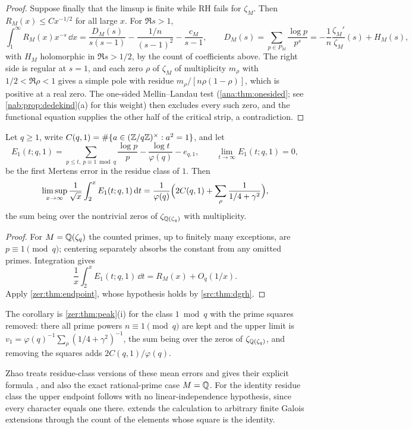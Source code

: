 \begin{proof}
Suppose finally that the limsup is finite while RH fails for $\zeta_M$. Then
$R_M(x)\le Cx^{-1/2}$ for all large $x$. For $\Re s>1$,
\[
 \int_1^\infty R_M(x)x^{-s}\,\dd x=\frac{D_M(s)}{s(s-1)}-\frac{1/n}{(s-1)^2}
 -\frac{c_M}{s-1},\qquad
 D_M(s)=\sum_{p\in P_M}\frac{\log p}{p^s}=-\frac1n\frac{\zeta_M'}{\zeta_M}(s)+H_M(s),
\]
with $H_M$ holomorphic in $\Re s>1/2$, by the count of coefficients above. The right side
is regular at $s=1$, and each zero $\rho$ of $\zeta_M$ of multiplicity $m_\rho$ with
$1/2<\Re\rho<1$ gives a simple pole with residue $m_\rho/[n\rho(1-\rho)]$, which is
positive at a real zero. The one-sided Mellin--Landau test (\cref{ana:thm:onesided};
see \cref{nab:prop:dedekind}(a) for this weight) then excludes every such zero, and the functional
equation supplies the other half of the critical strip, a contradiction.
\end{proof}

\begin{corollary}\label{zer:cor:cyclotomic}
Let $q\ge1$, write $C(q,1)=\#\{a\in(\mathbb{Z}/q\mathbb{Z})^\times:a^2=1\}$, and let
\[
 E_1(t;q,1)=\sum_{p\le t,\ p\equiv1\bmod q}\frac{\log p}p-\frac{\log t}{\varphi(q)}-e_{q,1},
 \qquad\lim_{t\to\infty}E_1(t;q,1)=0,
\]
be the first Mertens error in the residue class of $1$. Then
\[
 \limsup_{x\to\infty}\frac1{\sqrt x}\int_2^xE_1(t;q,1)\,\mathrm{d} t
 =\frac1{\varphi(q)}\Bigl(2C(q,1)+\sum_\rho\frac1{1/4+\gamma^2}\Bigr),
\]
the sum being over the nontrivial zeros of $\zeta_{\mathbb{Q}(\zeta_q)}$ with multiplicity.
\end{corollary}
\begin{proof}
For $M=\mathbb{Q}(\zeta_q)$ the counted primes, up to finitely many exceptions, are
$p\equiv1\pmod q$; centering separately absorbs the constant from any omitted primes.
Integration gives
\[
 \frac1x\int_2^xE_1(t;q,1)\,\dd t=R_M(x)+O_q(1/x).
\]
Apply
\cref{zer:thm:endpoint}, whose hypothesis holds by \cref{src:thm:dgrh}.
\end{proof}

The corollary is \cref{zer:thm:peak}(i) for the class $1\bmod q$ with the prime squares
removed: there all prime powers $n\equiv1\pmod q$ are kept and the upper limit is
$v_1=\varphi(q)^{-1}\sum_\rho(1/4+\gamma^2)^{-1}$, the sum being over the zeros of
$\zeta_{\mathbb{Q}(\zeta_q)}$, and removing the squares adds $2C(q,1)/\varphi(q)$.

Zhao treats residue-class versions of these mean errors and gives their explicit formula
\cite[Theorem~4 and \S7]{Zhao2025Mertens}, and also the exact rational-prime case
$M=\mathbb{Q}$. For the identity residue class the upper endpoint follows with no
linear-independence hypothesis, since every character equals one there.
 extends the calculation to arbitrary finite Galois extensions
through the count of the elements whose square is the identity.

